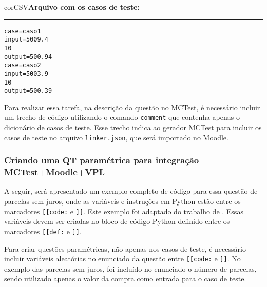 \begin{myboxCode}{corCSV}{\textbf{Arquivo com os casos de teste:}}\vspace{3mm}
\hrule
\begin{verbatim}
case=caso1
input=5009.4
10
output=500.94
case=caso2
input=5003.9
10
output=500.39
\end{verbatim}
\end{myboxCode}

Para realizar essa tarefa, na descrição da questão no MCTest, é necessário incluir um trecho de código utilizando o comando \verb|comment| que contenha apenas o dicionário de casos de teste. Esse trecho indica ao gerador MCTest para incluir os casos de teste no arquivo \verb|linker.json|, que será importado no Moodle.


\subsubsection{Criando uma QT paramétrica para integração MCTest+Moodle+VPL}

A seguir, será apresentado um exemplo completo de código para essa questão de parcelas sem juros, onde as variáveis e instruções em Python estão entre os marcadores \verb|[[code:| e \verb|]]|. Este exemplo foi adaptado do trabalho de . Essas variáveis devem ser criadas no bloco de código Python definido entre os marcadores \verb|[[def:| e \verb|]]|.

Para criar questões paramétricas, não apenas nos casos de teste, é necessário incluir variáveis aleatórias no enunciado da questão entre \verb|[[code:| e \verb|]]|. No exemplo das parcelas sem juros, foi incluído no enunciado o número de parcelas, sendo utilizado apenas o valor da compra como entrada para o caso de teste.


